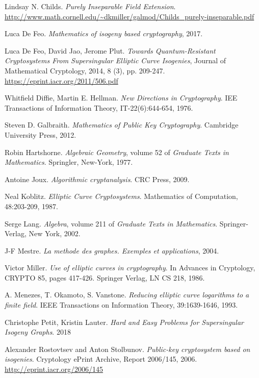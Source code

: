 \documentclass{article}
\theoremstyle{theorem}
\theoremstyle{definition}
\begin{document}
\newpage
\begin{thebibliography}{}
	 Lindsay N. Childs. \textit{Purely Inseparable Field Extension}. \url{http://www.math.cornell.edu/~dkmiller/galmod/Childs_purely-inseparable.pdf}
	
	 Luca De Feo. \textit{Mathematics of isogeny based cryptography}, 2017.
	
	 Luca De Feo, David Jao, Jerome Plut. \textit{Towards Quantum-Resistant Cryptosystems From Supersingular Elliptic Curve Isogenies}, Journal of Mathematical Cryptology, 2014, 8 (3), pp. 209-247. \url{https://eprint.iacr.org/2011/506.pdf}
	
	 Whitfield Diffie, Martin E. Hellman. \textit{New Directions in Cryptography}. IEE Transactions of Information Theory, IT-22(6):644-654, 1976.
	
	 Steven D. Galbraith. \textit{Mathematics of Public Key Cryptography}. Cambridge University Press, 2012.
	
	 Robin Hartshorne. \textit{Algebraic Geometry}, volume 52 of \textit{Graduate Texts in Mathematics}. Springler, New-York, 1977.
	
	 Antoine Joux. \textit{Algorithmic cryptanalysis}. CRC Press, 2009.
	
	 Neal Koblitz. \textit{Elliptic Curve Cryptosystems}. Mathematics of Computation, 48:203-209, 1987.
	
	 Serge Lang. \textit{Algebra}, volume 211 of \textit{Graduate Texts in Mathematics}. Springer-Verlag, New York, 2002.

	 J-F Mestre. \textit{La methode des graphes. Exemples et applications}, 2004.
	
	 Victor Miller. \textit{Use of elliptic curves in cryptography}. In Advances in Cryptology, CRYPTO 85, pages 417-426. Springer Verlag, LN CS 218, 1986.
	
	 A. Menezes, T. Okamoto, S. Vanstone. \textit{Reducing elliptic curve logarithms to a finite field}. IEEE Transactions on Information Theory, 39:1639-1646, 1993.
	
	 Christophe Petit, Kristin Lauter. \textit{Hard and Easy Problems for Supersingular Isogeny Graphs}. 2018
	
	 Alexander Rostovtsev and Anton Stolbunov. \textit{Public-key cryptosystem based on isogenies}. Cryptology ePrint Archive, Report 2006/145, 2006. \url{http://eprint.iacr.org/2006/145}
	

\end{thebibliography}
\end{document}
